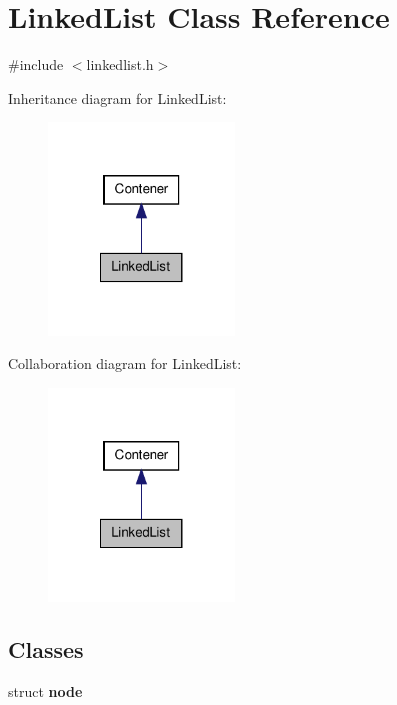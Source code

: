 \hypertarget{class_linked_list}{\section{\-Linked\-List \-Class \-Reference}
\label{class_linked_list}
}


{\ttfamily \#include $<$linkedlist.\-h$>$}



\-Inheritance diagram for \-Linked\-List\-:\nopagebreak
\begin{figure}[H]
\begin{center}
\leavevmode
\includegraphics[width=140pt]{class_linked_list__inherit__graph}
\end{center}
\end{figure}


\-Collaboration diagram for \-Linked\-List\-:\nopagebreak
\begin{figure}[H]
\begin{center}
\leavevmode
\includegraphics[width=140pt]{class_linked_list__coll__graph}
\end{center}
\end{figure}
\subsection*{\-Classes}
\begin{DoxyCompactItemize}
\item 
struct {\bfseries node}
\end{DoxyCompactItemize}

